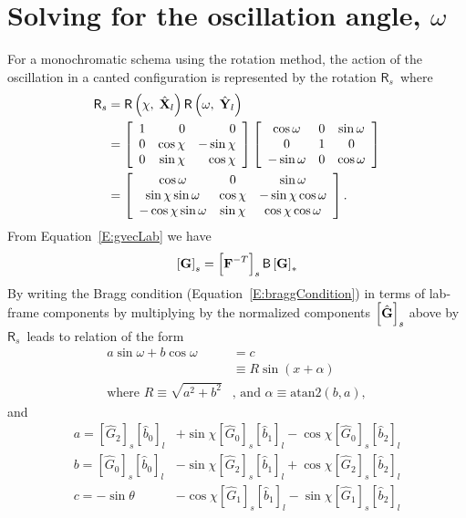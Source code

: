 \documentclass[12pt,letterpaper,final]{amsart}
\newcommand{\mbm}[1]{\ensuremath{\mbox{\boldmath$#1$}}}
\newcommand{\rmats}{\ensuremath{\mathsf{R}_s}}
\newcommand{\bmat}{\ensuremath{\mathsf{B}}}
\newcommand{\gvec}{\ensuremath{\mbm{\mathrm{G}}}}
\newcommand{\ghat}{\ensuremath{\hat{\mbm{\mathrm{G}}}}}
\newcommand{\defgrad}{\ensuremath{\mbm{\mathrm{F}}}}
\newcommand{\Xl}{\ensuremath{\hat{\mbm{\mathrm{X}}}_l}}
\newcommand{\Yl}{\ensuremath{\hat{\mbm{\mathrm{Y}}}_l}}
\newcommand{\labcomps}[1]{\left[#1\right]_l}
\newcommand{\sampcomps}[1]{\left[#1\right]_s}
\newcommand{\rcpcomps}[1]{\left[#1\right]_*}
\newcommand{\eqnref}[1]{Equation~\ref{#1}}
\newcommand{\cow}{\ensuremath{\cos\omega}}
\newcommand{\siw}{\ensuremath{\sin\omega}}
\newcommand{\cox}{\ensuremath{\cos\chi}}
\newcommand{\six}{\ensuremath{\sin\chi}}
\newcommand{\hgZ}{\ensuremath{\hat{G}_0}}
\newcommand{\hgO}{\ensuremath{\hat{G}_1}}
\newcommand{\hgT}{\ensuremath{\hat{G}_2}}
\newcommand{\hbZ}{\ensuremath{\hat{b}_0}}
\newcommand{\hbO}{\ensuremath{\hat{b}_1}}
\newcommand{\hbT}{\ensuremath{\hat{b}_2}}
\newcommand{\rmat}[2]{\ensuremath{\mathsf{R}\left(#1,\;#2\right)}}
\begin{document}
\section{Solving for the oscillation angle, $\omega$}\label{S:oscill}
For a monochromatic schema using the rotation method, the action of the oscillation in a canted configuration is represented by the rotation \rmats\, where
\begin{align}
	\rmats &= \rmat{\chi}{\Xl}\rmat{\omega}{\Yl} \label{E:rmats} \\
	&= \left[\begin{array}{rrr}1&0&0\\0&\cox&-\six\\0&\six&\cox\end{array}\right]
	   \left[\begin{array}{ccc}\cow&0&\siw\\0&1&0\\-\siw&0&\cow\end{array}\right] \nonumber\\
	&= \left[\begin{array}{ccc} 
	       \cow     &  0   &      \siw \\
	       \six\siw & \cox & -\six\cow \\
	      -\cox\siw & \six &   \cox\cow
	   \end{array}\right] . \nonumber
\end{align}
From \eqnref{E:gvecLab} we have
\begin{equation}
    \sampcomps{\gvec} = \sampcomps{\defgrad^{-T}}\bmat\rcpcomps{\gvec} \label{E:ghatInSamp}
\end{equation}
By writing the Bragg condition (\eqnref{E:braggCondition}) in terms of lab-frame components by multiplying by the normalized components $\sampcomps{\ghat}$ above by \rmats\ leads to relation of the form 
\begin{align}
    a \siw + b \cow &= c \label{E:trig}\\
                    &\equiv R\sin{\left(x+\alpha\right)} \label{E:identity}\\
                    \mbox{where } R\equiv\sqrt{a^2 + b^2} &\mbox{, and } \alpha\equiv\mathrm{atan2}(b, a),
\end{align}
and 
\begin{align}
    a = \sampcomps{\hgT}\labcomps{\hbZ} &+ \six\sampcomps{\hgZ}\labcomps{\hbO} - \cox\sampcomps{\hgZ}\labcomps{\hbT}\\
    b = \sampcomps{\hgZ}\labcomps{\hbZ} &- \six\sampcomps{\hgT}\labcomps{\hbO} + \cox\sampcomps{\hgT}\labcomps{\hbT}\\
    c =                  -\sin{\theta} &- \cox\sampcomps{\hgO}\labcomps{\hbO} - \six\sampcomps{\hgO}\labcomps{\hbT}
\end{align}
\end{document}
